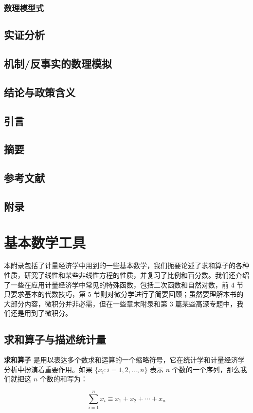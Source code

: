 \documentclass[cn,10pt,math=newtx,citestyle=gb7714-2015,bibstyle=gb7714-2015]{elegantbook}
\begin{document}
	\subsection{数理模型式}
	
	
	\section{实证分析}
	
	
	\section{机制/反事实的数理模拟}
	
	\section{结论与政策含义}
	
	\section{引言}
	
	\section{摘要}
	
	
	\section{参考文献}
	
	\section{附录}
	
	
	
	\nocite{*} 
	\printbibliography
	\appendix
	
	\chapter{基本数学工具}
	
	
	本附录包括了计量经济学中用到的一些基本数学，我们扼要论述了求和算子的各种性质，研究了线性和某些非线性方程的性质，并复习了比例和百分数。我们还介绍了一些在应用计量经济学中常见的特殊函数，包括二次函数和自然对数，前 4 节只要求基本的代数技巧，第 5 节则对微分学进行了简要回顾；虽然要理解本书的大部分内容，微积分并非必需，但在一些章末附录和第 3 篇某些高深专题中，我们还是用到了微积分。
	
	\section{求和算子与描述统计量}
	
	\textbf{求和算子} 是用以表达多个数求和运算的一个缩略符号，它在统计学和计量经济学分析中扮演着重要作用。如果 $\{x_i: i=1, 2, \ldots, n\}$ 表示 $n$ 个数的一个序列，那么我们就把这 $n$ 个数的和写为：
	
	\begin{equation}
		\sum_{i=1}^n x_i \equiv x_1 + x_2 +\cdots + x_n
	\end{equation}
	
	
	
\end{document}
